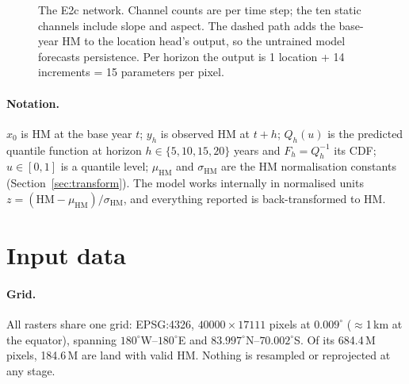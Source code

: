 \documentclass[11pt,a4paper]{article}
\newcommand{\HM}{\mathrm{HM}}
\begin{document}
\begin{figure}[t]
{}
\caption{The E2c network. Channel counts are per time step; the ten static channels include
slope and aspect. The dashed path adds the base-year
HM to the location head's output, so the untrained model forecasts persistence. Per horizon the
output is 1 location + 14 increments = 15 parameters per pixel.}
\label{fig:arch}
\end{figure}

\paragraph{Notation.} $x_0$ is HM at the base year $t$; $y_h$ is observed HM at $t+h$;
$Q_h(u)$ is the predicted quantile function at horizon $h\in\{5,10,15,20\}$ years and
$F_h = Q_h^{-1}$ its CDF; $u\in[0,1]$ is a quantile level; $\mu_{\HM}$ and $\sigma_{\HM}$ are the
HM normalisation constants (Section~\ref{sec:transform}). The model works internally in
normalised units $z = (\HM-\mu_{\HM})/\sigma_{\HM}$, and everything reported is back-transformed
to HM.

\section{Input data}
\label{sec:data}

\paragraph{Grid.} All rasters share one grid: EPSG:4326, $40000\times17111$ pixels at
$0.009^\circ$ ($\approx$1\,km at the equator), spanning $180^\circ$W--$180^\circ$E and
$83.997^\circ$N--$70.002^\circ$S. Of its 684.4\,M pixels, 184.6\,M are land with valid HM.
Nothing is resampled or reprojected at any stage.
\end{document}
